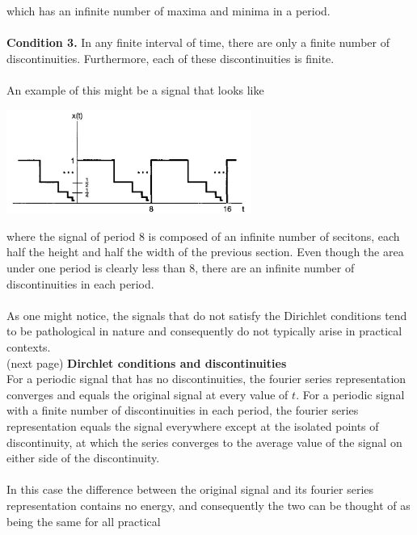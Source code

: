 \documentclass{report}
\begin{document}
which has an infinite number of maxima and minima in a period.\\
\vspace{1mm}\\
\textbf{Condition 3.} In any finite interval of time, there are only a finite number of discontinuities. Furthermore, each of these discontinuities is finite.\\
\vspace{1mm}\\
An example of this might be a signal that looks like
\begin{center}
\includegraphics[width=8cm]{a60}\\
\end{center}
where the signal of period 8 is composed of an infinite number of secitons, each half the height and half the width of the previous section. Even though the area under one period is clearly 
less than 8, there are an infinite number of discontinuities in each period.\\
\vspace{1mm}\\
As one might notice, the signals that do not satisfy the Dirichlet conditions tend to be pathological in nature and consequently do not typically arise in practical contexts.\\
(next page)\newpage
\noindent\textbf{Dirchlet conditions and discontinuities}\\
For a periodic signal that has no discontinuities, the fourier series representation converges and equals the original signal at every value of $t$. For a periodic signal with a finite number of 
discontinuities in each period, the fourier series representation equals the signal everywhere except at the isolated points of discontinuity, at which the series converges to the average value
of the signal on either side of the discontinuity.\\
\vspace{1mm}\\
In this case the difference between the original signal and its fourier series representation contains
no energy, and consequently the two can be thought of as being the same for all practical 
\end{document}
